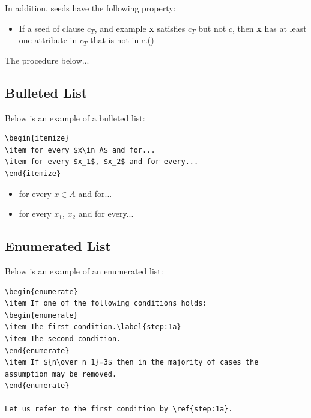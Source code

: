 \documentclass[withtitlethanks]{actacyb}
\begin{document}
In addition, seeds have the following property:

\begin{itemize}
\item[] 
If a seed of clause $c_T$, and example {\bf x} satisfies $c_T$ but
not $c$, then {\bf x} has at least one attribute in $c_T$ that
is not in $c$.\hfill({\tt*})
\end{itemize}
The procedure below...

\subsection{Bulleted List}

Below is an example of a bulleted list:

\begin{verbatim}
\begin{itemize}
\item for every $x\in A$ and for...
\item for every $x_1$, $x_2$ and for every...
\end{itemize} 
\end{verbatim}

\begin{itemize}
\item for every $x\in A$ and for...
\item for every $x_1$, $x_2$ and for every...
\end{itemize} 

\subsection{Enumerated List}
Below is an example of an enumerated list:

\begin{verbatim}
\begin{enumerate}
\item If one of the following conditions holds:
\begin{enumerate}
\item The first condition.\label{step:1a}
\item The second condition.
\end{enumerate}
\item If ${n\over n_1}=3$ then in the majority of cases the 
assumption may be removed.
\end{enumerate}

Let us refer to the first condition by \ref{step:1a}.
\end{verbatim}
\end{document}

